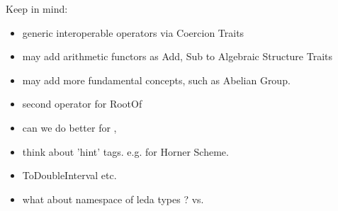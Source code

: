 Keep in mind: 
\begin{itemize}
\item generic interoperable operators via Coercion Traits
\item may add arithmetic functors as Add, Sub to Algebraic Structure Traits
\item may add more fundamental concepts, such as Abelian Group.
\item second operator for RootOf
\item can we do better for , 
\item think about 'hint' tags. e.g. for Horner Scheme. 
\item ToDoubleInterval etc. 
\item what about namespace of leda types ?  vs. 
\end{itemize}


